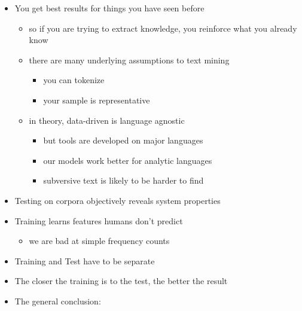 \documentclass[a4paper,landscape,headrule,footrule,xetex]{foils}
\begin{document}

\begin{itemize}
\item You get best results for things you have seen before
  \begin{itemize}
  \item so if you are trying to extract knowledge, you reinforce what
    you already know
  \item there are many underlying assumptions to text mining
    \begin{itemize}
    \item you can tokenize
    \item your sample is representative
    \end{itemize}
  \item in theory, data-driven is language agnostic
    \begin{itemize}
    \item but tools are developed on major languages
    \item our models work better for analytic languages
    \item subversive text is likely to be harder to find
    \end{itemize}

  \end{itemize}
\end{itemize}



\begin{itemize}
\item Testing on corpora objectively reveals system properties
\item Training learns features humans don't predict
  \begin{itemize}
  \item we are bad at simple frequency counts
  \end{itemize}
\item Training and Test have to be separate
\item The closer the training is to the test, the better the result
\item The general conclusion: 
\end{itemize}
\end{document}
